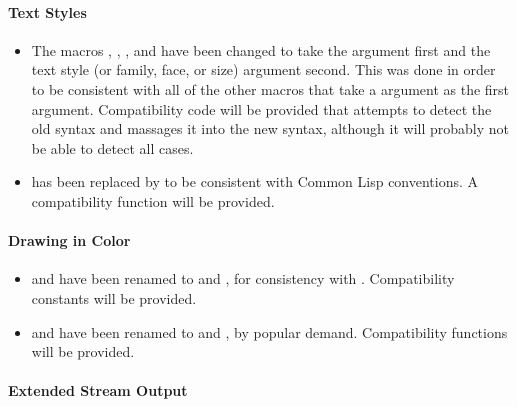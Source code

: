 \paragraph {Text Styles}

\begin{itemize}
\item The macros , ,
, and  have been changed to take the
 argument first and the text style (or family, face, or size)
argument second.  This was done in order to be consistent with all of the other
macros that take a  argument as the first argument.  Compatibility
code will be provided that attempts to detect the old syntax and massages it
into the new syntax, although it will probably not be able to detect all cases.

\item {} has been replaced by 
to be consistent with Common Lisp conventions.  A compatibility function will be
provided. 
\end{itemize}


\paragraph {Drawing in Color}

\begin{itemize}
\item {} and  have been renamed to
 and , for consistency with
.  Compatibility constants will be provided.

\item {} and  have been renamed to
 and , by popular demand.  Compatibility
functions will be provided.
\end{itemize}


\paragraph {Extended Stream Output}

